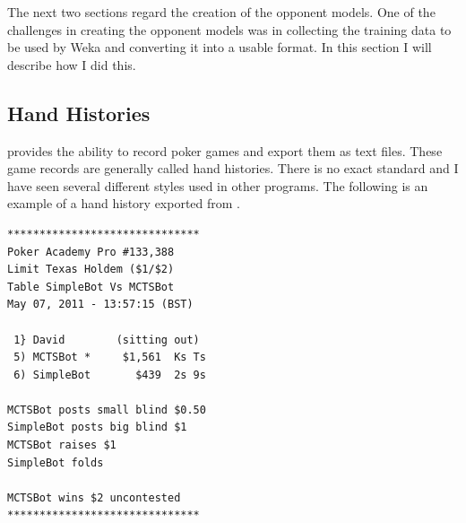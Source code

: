 

The next two sections regard the creation of the opponent models. One of the challenges in creating the opponent models was in collecting the training data to be used by Weka and converting it into a usable format. In this section I will describe how I did this.



\subsection{Hand Histories}							%


\pap provides the ability to record poker games and export them as text files. These game records are generally called hand histories. There is no exact standard and I have seen several different styles used in other programs. The following is an example of a hand history exported from \pap. 

\begin{verbatim}
******************************
Poker Academy Pro #133,388
Limit Texas Holdem ($1/$2)
Table SimpleBot Vs MCTSBot
May 07, 2011 - 13:57:15 (BST)

 1} David        (sitting out)
 5) MCTSBot *     $1,561  Ks Ts
 6) SimpleBot       $439  2s 9s

MCTSBot posts small blind $0.50
SimpleBot posts big blind $1
MCTSBot raises $1
SimpleBot folds

MCTSBot wins $2 uncontested
******************************
\end{verbatim}


